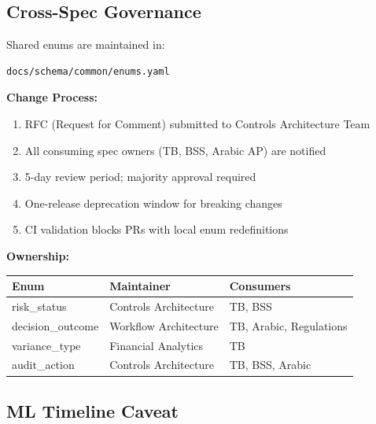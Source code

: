 \subsection{Cross-Spec Governance}
\label{sec:cross-spec-governance}

\begin{tcolorbox}[colback=blue!5,colframe=blue!70,title=Cross-Spec Governance Protocol]

Shared enums are maintained in:
\begin{verbatim}
docs/schema/common/enums.yaml
\end{verbatim}

\textbf{Change Process:}
\begin{enumerate}
    \item RFC (Request for Comment) submitted to Controls Architecture Team
    \item All consuming spec owners (TB, BSS, Arabic AP) are notified
    \item 5-day review period; majority approval required
    \item One-release deprecation window for breaking changes
    \item CI validation blocks PRs with local enum redefinitions
\end{enumerate}

\textbf{Ownership:}
\begin{tabular}{lll}
\toprule
\textbf{Enum} & \textbf{Maintainer} & \textbf{Consumers} \\
\midrule
risk\_status & Controls Architecture & TB, BSS \\
decision\_outcome & Workflow Architecture & TB, Arabic, Regulations \\
variance\_type & Financial Analytics & TB \\
audit\_action & Controls Architecture & TB, BSS, Arabic \\
\bottomrule
\end{tabular}
\end{tcolorbox}

\subsection{ML Timeline Caveat}
\label{sec:ml-caveat}

